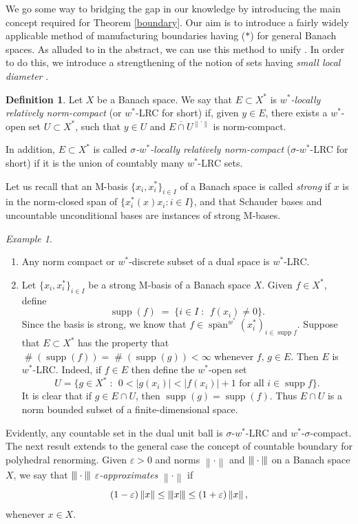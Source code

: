 \documentclass[12pt,a4paper]{amsart}
\theoremstyle{definition}
\newtheorem{definition}[theorem]{Definition}
\theoremstyle{remark}
\newtheorem{example}[theorem]{Example}
\DeclareMathOperator{\card}{\#}
\DeclareMathOperator{\s}{span}
\DeclareMathOperator{\supp}{supp}
\newcommand{\cl}[1]{\ensuremath{\overline{{#1}}}}
\newcommand{\eps}{\ensuremath{\varepsilon}}
\newcommand{\n}[1]{\ensuremath{\left\|{#1}\right\|}}
\newcommand{\ndot}{\ensuremath{\left\|\cdot\right\|}}
\newcommand{\set}[2]{\{{#1} \;:\;\, {#2}\}}
\newcommand{\st}{($*$)}
\newcommand{\tri}{{\displaystyle |\kern-.9pt|\kern-.9pt|}}
\newcommand{\tn}[1]{\ensuremath{\tri{#1}\tri}}
\newcommand{\tndot}{\ensuremath{\tri\cdot\tri}}
\begin{document}
We go some way to bridging the gap in our knowledge by introducing the main concept
required for Theorem \ref{boundary}. Our aim is to introduce a fairly
widely applicable method of manufacturing boundaries having {\st}
for general Banach spaces. As alluded to in the abstract, we can use this method to unify \cite[Theorems 11 and
24]{FPST}. In order to do this, we introduce a strengthening of the
notion of sets having {\em small local diameter} \cite[p.\
162]{jnr:92}.

\begin{definition}\label{banach-lrc}
Let $X$ be a Banach space. We say that $E \subset X^*$ is {\em $w^*$-locally
relatively norm-compact} (or $w^*$-LRC for short) if, given
$y \in E$, there exists a $w^*$-open set $U \subset X^*$, such that
$y \in U$ and $\cl{E \cap U}^{\ndot}$ is norm-compact.

In addition, $E \subset X^*$ is called {\em $\sigma$-$w^*$-locally relatively
norm-compact} ($\sigma$-$w^*$-LRC for short) if it is the union of countably
many $w^*$-LRC sets.
\end{definition}

Let us recall that an M-basis $\{x_i,x_i^*\}_{i \in I}$ of a Banach space
is called {\em strong} if $x$ is in the norm-closed span of
$\{ x_i^*(x) x_i : i\in I\}$, and that Schauder bases and uncountable
unconditional bases are instances of strong M-bases.

\begin{example}\label{weakstarlrcex}$\;$
\begin{enumerate}
\item Any norm compact or $w^*$-discrete subset of a dual space is $w^*$-LRC.
\item Let $\{x_i,x_i^*\}_{i \in I}$ be a strong M-basis of a Banach space
$X$. Given $f \in X^*$, define
\[
\supp(f) \;=\; \set{i \in I}{f(x_i) \neq 0}.
\]
Since the basis is strong, we know that $f \in
\cl{\s}^{w^*}(x_i^*)_{i \in \supp f}$. Suppose that $E \subset X^*$
has the property that $\card(\supp(f))=\card(\supp(g)) < \infty$
whenever $f,\,g \in E$. Then $E$ is $w^*$-LRC. Indeed, if $f \in E$
then define the $w^*$-open set
\[
U = \set{g \in X^*}{{\textstyle 0 < |g(x_i)| < |f(x_i)|+1}
\text{ for all }i \in \supp f}.
\]
It is clear that if $g \in E \cap U$, then $\supp(g) = \supp(f)$.
Thus $E \cap U$ is a norm bounded subset of a finite-dimensional space.
\end{enumerate}
\end{example}

Evidently, any countable set in the dual unit ball is $\sigma$-$w^*$-LRC
and $w^*$-$\sigma$-compact. The next result extends to the general case
the concept of countable boundary for polyhedral renorming. Given $\eps > 0$
and norms $\ndot$ and $\tndot$ on a Banach space $X$,
we say that $\tndot$ {\em $\eps$-approximates} $\ndot$ if
\[
(1-\eps)\n{x} \leq \tn{x} \leq (1+\eps)\n{x},
\]
whenever $x \in X$.
\end{document}
